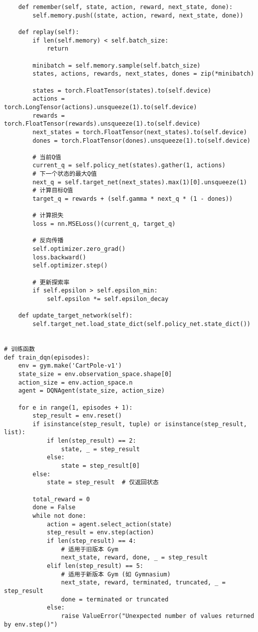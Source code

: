 \begin{lstlisting}
    def remember(self, state, action, reward, next_state, done):
        self.memory.push((state, action, reward, next_state, done))

    def replay(self):
        if len(self.memory) < self.batch_size:
            return

        minibatch = self.memory.sample(self.batch_size)
        states, actions, rewards, next_states, dones = zip(*minibatch)

        states = torch.FloatTensor(states).to(self.device)
        actions = torch.LongTensor(actions).unsqueeze(1).to(self.device)
        rewards = torch.FloatTensor(rewards).unsqueeze(1).to(self.device)
        next_states = torch.FloatTensor(next_states).to(self.device)
        dones = torch.FloatTensor(dones).unsqueeze(1).to(self.device)

        # 当前Q值
        current_q = self.policy_net(states).gather(1, actions)
        # 下一个状态的最大Q值
        next_q = self.target_net(next_states).max(1)[0].unsqueeze(1)
        # 计算目标Q值
        target_q = rewards + (self.gamma * next_q * (1 - dones))

        # 计算损失
        loss = nn.MSELoss()(current_q, target_q)

        # 反向传播
        self.optimizer.zero_grad()
        loss.backward()
        self.optimizer.step()

        # 更新探索率
        if self.epsilon > self.epsilon_min:
            self.epsilon *= self.epsilon_decay

    def update_target_network(self):
        self.target_net.load_state_dict(self.policy_net.state_dict())


# 训练函数
def train_dqn(episodes):
    env = gym.make('CartPole-v1')
    state_size = env.observation_space.shape[0]
    action_size = env.action_space.n
    agent = DQNAgent(state_size, action_size)

    for e in range(1, episodes + 1):
        step_result = env.reset()
        if isinstance(step_result, tuple) or isinstance(step_result, list):
            if len(step_result) == 2:
                state, _ = step_result
            else:
                state = step_result[0]
        else:
            state = step_result  # 仅返回状态

        total_reward = 0
        done = False
        while not done:
            action = agent.select_action(state)
            step_result = env.step(action)
            if len(step_result) == 4:
                # 适用于旧版本 Gym
                next_state, reward, done, _ = step_result
            elif len(step_result) == 5:
                # 适用于新版本 Gym (如 Gymnasium)
                next_state, reward, terminated, truncated, _ = step_result
                done = terminated or truncated
            else:
                raise ValueError("Unexpected number of values returned by env.step()")


\end{lstlisting}
